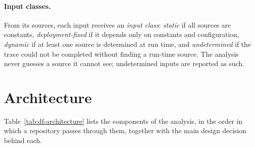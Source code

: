 \paragraph{Input classes.} From its sources, each input receives an \emph{input class}: \emph{static} if all sources are constants, \emph{deployment-fixed} if it depends only on constants and configuration, \emph{dynamic} if at least one source is determined at run time, and \emph{undetermined} if the trace could not be completed without finding a run-time source. The analysis never guesses a source it cannot see; undetermined inputs are reported as such.

\section{Architecture}
\label{sec:df-architecture}

Table~\ref{tab:df-architecture} lists the components of the analysis, in the order in which a repository passes through them, together with the main design decision behind each.

